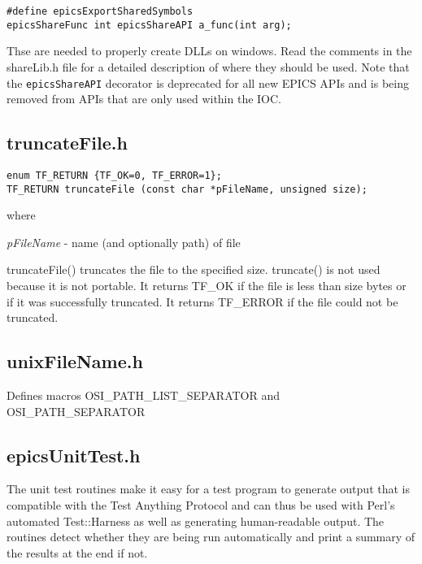 \begin{verbatim}
#define epicsExportSharedSymbols
epicsShareFunc int epicsShareAPI a_func(int arg);
\end{verbatim}

Thse are needed to properly create DLLs on windows.
Read the comments in the shareLib.h file for a detailed description of where they should be used.
Note that the \verb|epicsShareAPI| decorator is deprecated for all new EPICS APIs and is being removed from APIs that are only used within the IOC.

\subsection{truncateFile.h}

\begin{verbatim}
enum TF_RETURN {TF_OK=0, TF_ERROR=1};
TF_RETURN truncateFile (const char *pFileName, unsigned size);
\end{verbatim}

where

\begin{description}
\item \emph{pFileName} - name (and optionally path) of file

\end{description}

truncateFile() truncates the file to the specified size.
truncate() is not used because it is not portable.
It returns TF\_OK if the file is less than size bytes or if it was successfully truncated.
It returns TF\_ERROR if the file could not be truncated.

\subsection{unixFileName.h}

Defines macros OSI\_PATH\_LIST\_SEPARATOR and OSI\_PATH\_SEPARATOR

\subsection{epicsUnitTest.h}

The unit test routines make it easy for a test program to generate output that is compatible with the Test Anything Protocol and can thus be used with Perl's automated Test::Harness as well as generating human-readable output.
The routines detect whether they are being run automatically and print a summary of the results at the end if not.

